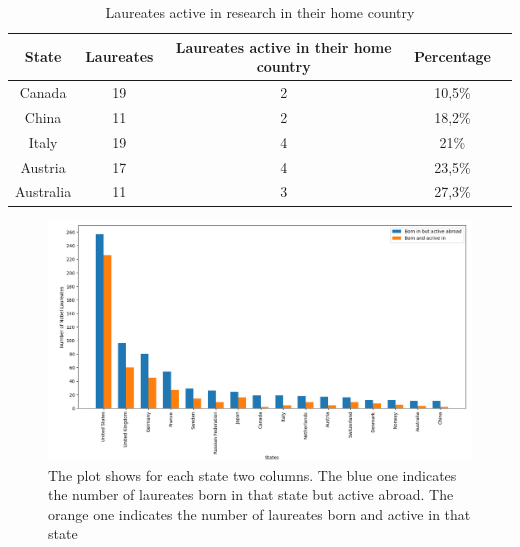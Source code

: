 \documentclass{article}
\begin{document}
\begin{table}[h!]
	\centering
	\begin{tabular}{|c|c|c|c|c|}
		\hline
		\textbf{State} & \textbf{Laureates} & \textbf{Laureates active in their home country} & \textbf{Percentage} \\ \hline
		Canada         & 19                 & 2                                               & 10,5\%              \\ \hline
		China          & 11                 & 2                                               & 18,2\%              \\ \hline
		Italy          & 19                 & 4                                               & 21\%                \\ \hline
		Austria        & 17                 & 4                                               & 23,5\%              \\ \hline
		Australia      & 11                 & 3                                               & 27,3\%              \\ \hline
	\end{tabular}
	\caption{Laureates active in research in their home country}
	\label{tab:laureates_active}
\end{table}

\begin{figure}[H]
	\centering
	\includegraphics[width=\textwidth]{../queries/plots/laureatesComparison.png}
	\caption{The plot shows for each state two columns. The blue one indicates the number of laureates born in that state but active abroad.
		The orange one indicates the number of laureates born and active in that state}
	\label{fig:laureatesComparison}
\end{figure}
\end{document}
